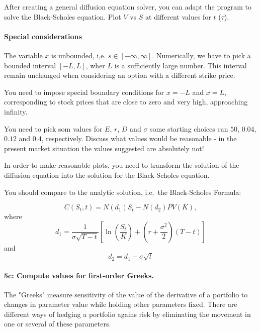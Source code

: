 \documentclass[%
oneside,                 %
final,                   %
10pt]{article}
\begin{document}
After creating a general diffusion equation solver, you
can adapt the program to solve the Black-Scholes equation.
Plot $V$ vs $S$ at different values for $t$ ($\tau$).

\paragraph{Special considerations}
The variable $x$ is unbounded, i,e. $s\in[-\infty, \infty]$. Numerically,
we have to pick a bounded interval $[-L, L]$, wher $L$ is a sufficiently 
large number. This interval remain unchanged when considering an option with a
different strike price.

You need to impose special boundary conditions for $x=-L$ and $x=L$, corresponding 
to stock prices that are close to zero and very high, approaching infinity.

You need to pick som values for $E$, $r$, $D$ and $\sigma$ some starting
choices can $50$, $0.04$, $0.12$ and $0.4$, respectively. Discuss what 
values would be reasonable - in the present market situation the values 
suggested are absolutely not!

In order to make reasonable plots, you need to transform the solution of 
the diffusion equation into the solution for the Black-Scholes 
equation. 

You should compare to the analytic solution, i.e.~the Black-Scholes Formula:

\begin{equation}
    C(S_t, t) = N(d_1) S_t - N(d_2) PV(K),
\end{equation}
where
\begin{equation}    
    d_1 = \frac{1}{\sigma \sqrt{T - t}}
    \left[
        \ln \left(\frac{S_t}{K} \right) 
        + \left(r + \frac{\sigma^2}{2} \right) (T - t)
    \right] 
\end{equation}
and
\begin{equation}
    d_2 = d_1 - \sigma \sqrt{t}
\end{equation}


\paragraph{5c: Compute values for first-order Greeks.}
The "Greeks" measure sensitivity of the value of the derivative of 
a portfolio to changes in parameter value while holding other 
parameters fixed. There are different ways of hedging a portfolio
agains risk by eliminating the movement in one or several of
these parameters.
\end{document}
